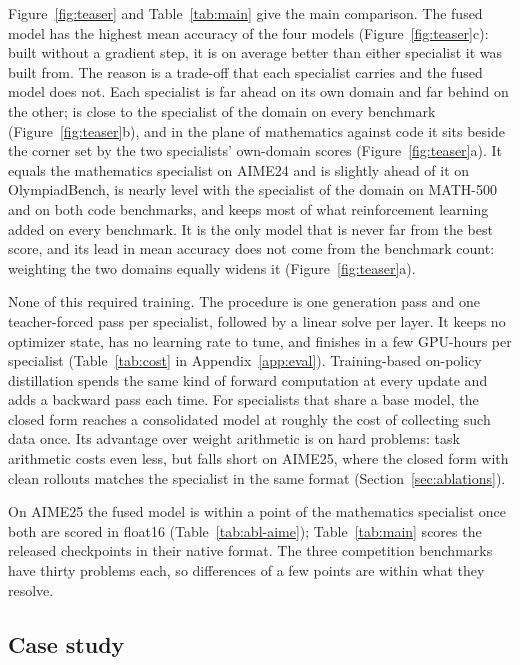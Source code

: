 Figure~\ref{fig:teaser} and Table~\ref{tab:main} give the main comparison.
The fused model has the highest mean accuracy of the four models
(Figure~\ref{fig:teaser}c): built without a gradient step, it is on average
better than either specialist it was built from. The reason is a trade-off
that each specialist carries and the fused model does not. Each specialist
is far ahead on its own domain and far behind on the other; \method is close
to the specialist of the domain on every benchmark
(Figure~\ref{fig:teaser}b), and in the plane of mathematics against code it
sits beside the corner set by the two specialists' own-domain scores
(Figure~\ref{fig:teaser}a). It equals the mathematics specialist on AIME24
and is slightly ahead of it on OlympiadBench, is nearly level with the
specialist of the domain on MATH-500 and on both code benchmarks, and keeps
most of what reinforcement learning added on every benchmark. It is the only
model that is never far from the best score, and its lead in mean accuracy
does not come from the benchmark count:
weighting the two domains equally widens it (Figure~\ref{fig:teaser}a).

None of this required training. The procedure is one generation pass and one
teacher-forced pass per specialist, followed by a linear solve per layer. It
keeps no optimizer state, has no learning rate to tune, and finishes in a few
GPU-hours per specialist (Table~\ref{tab:cost} in Appendix~\ref{app:eval}).
Training-based on-policy distillation spends the same kind of forward
computation at every update and adds a backward pass each time. For
specialists that share a base model, the closed form reaches a consolidated
model at roughly the cost of collecting such data once. Its advantage over
weight arithmetic is on hard problems: task arithmetic costs even less, but
falls short on AIME25, where the closed form with clean rollouts matches the
specialist in the same format (Section~\ref{sec:ablations}).

On AIME25 the fused model is within a point of the mathematics specialist
once both are scored in float16 (Table~\ref{tab:abl-aime});
Table~\ref{tab:main} scores the released checkpoints in their native format.
The three competition benchmarks have thirty problems each, so differences
of a few points are within what they resolve.

\subsection{Case study}
\label{sec:cases}

